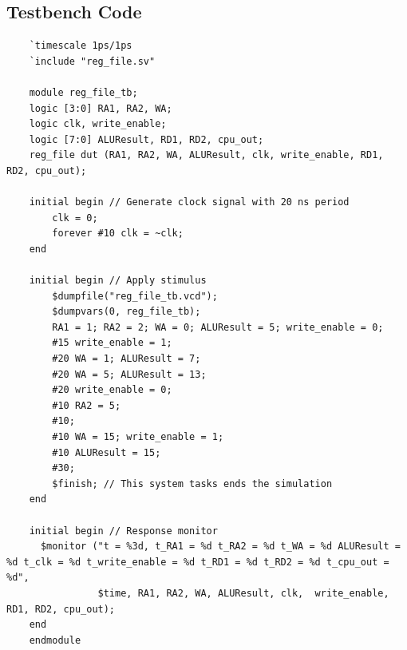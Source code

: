 \documentclass{article}
\begin{document}
\subsection{Testbench Code}
\begin{lstlisting}
    `timescale 1ps/1ps 
    `include "reg_file.sv"
    
    module reg_file_tb;
    logic [3:0] RA1, RA2, WA;
    logic clk, write_enable;
    logic [7:0] ALUResult, RD1, RD2, cpu_out;
    reg_file dut (RA1, RA2, WA, ALUResult, clk, write_enable, RD1, RD2, cpu_out);
    
    initial begin // Generate clock signal with 20 ns period
        clk = 0;
        forever #10 clk = ~clk;
    end
    
    initial begin // Apply stimulus 
        $dumpfile("reg_file_tb.vcd");
        $dumpvars(0, reg_file_tb);
        RA1 = 1; RA2 = 2; WA = 0; ALUResult = 5; write_enable = 0; 
        #15 write_enable = 1;
        #20 WA = 1; ALUResult = 7;
        #20 WA = 5; ALUResult = 13;
        #20 write_enable = 0;
        #10 RA2 = 5;
        #10;
        #10 WA = 15; write_enable = 1;
        #10 ALUResult = 15;
        #30;
        $finish; // This system tasks ends the simulation 
    end
    
    initial begin // Response monitor
      $monitor ("t = %3d, t_RA1 = %d t_RA2 = %d t_WA = %d ALUResult = %d t_clk = %d t_write_enable = %d t_RD1 = %d t_RD2 = %d t_cpu_out = %d",
                $time, RA1, RA2, WA, ALUResult, clk,  write_enable, RD1, RD2, cpu_out);
    end
    endmodule
\end{lstlisting}
\end{document}
